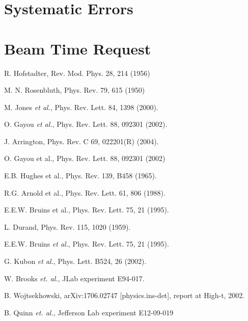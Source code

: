 \documentclass[11pt]{article}
\begin{document}
\section{Systematic Errors}
\section{Beam Time Request}


\begin{thebibliography}{9}
R. Hofstadter, Rev. Mod. Phys. 28, 214 (1956)

M. N. Rosenbluth, Phys. Rev. 79, 615 (1950)


M. Jones \emph{et al.}, Phys. Rev. Lett. 84, 1398 (2000).

O. Gayou \emph{et al.}, Phys. Rev. Lett. 88, 092301 (2002).

J. Arrington, Phys. Rev. C 69, 022201(R) (2004).

O. Gayou et al., Phys. Rev. Lett. 88, 092301 (2002)

E.B. Hughes et al., Phys. Rev. 139, B458 (1965).

R.G. Arnold et al., Phys. Rev. Lett. 61, 806 (1988).

 E.E.W. Bruins et al., Phys. Rev. Lett. 75, 21 (1995).

L. Durand, Phys. Rev. 115, 1020 (1959).


E.E.W. Bruins \emph{et al.}, Phys. Rev. Lett. 75, 21 (1995).

G. Kubon \emph{et al.}, Phys. Lett. B524, 26 (2002).

W. Brooks  \emph{et. al.}, JLab experiment E94-017.

B. Wojtsekhowski, arXiv:1706.02747 [physics.ins-det], report at High-t, 2002.

B. Quinn \emph{et. al.}, Jefferson Lab experiment E12-09-019
\end{thebibliography}
\end{document}
